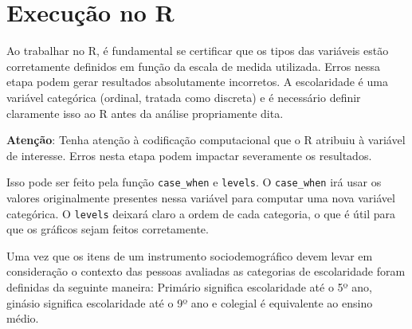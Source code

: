 \documentclass[
]{book}
\newenvironment{Shaded}{\begin{snugshade}}{\end{snugshade}}
\newcommand{\DataTypeTok}[1]{\textcolor[rgb]{0.13,0.29,0.53}{#1}}
\newcommand{\DecValTok}[1]{\textcolor[rgb]{0.00,0.00,0.81}{#1}}
\newcommand{\KeywordTok}[1]{\textcolor[rgb]{0.13,0.29,0.53}{\textbf{#1}}}
\newcommand{\NormalTok}[1]{#1}
\newcommand{\OperatorTok}[1]{\textcolor[rgb]{0.81,0.36,0.00}{\textbf{#1}}}
\newcommand{\StringTok}[1]{\textcolor[rgb]{0.31,0.60,0.02}{#1}}
\begin{document}
\hypertarget{execuuxe7uxe3o-no-r-5}{%
\section{Execução no R}\label{execuuxe7uxe3o-no-r-5}}

Ao trabalhar no R, é fundamental se certificar que os tipos das
variáveis estão corretamente definidos em função da escala de medida
utilizada. Erros nessa etapa podem gerar resultados absolutamente
incorretos. A escolaridade é uma variável categórica (ordinal, tratada
como discreta) e é necessário definir claramente isso ao R antes da
análise propriamente dita.

\begin{warning}

\textbf{Atenção}: Tenha atenção à codificação computacional que o R
atribuiu à variável de interesse. Erros nesta etapa podem impactar
severamente os resultados.

\end{warning}

Isso pode ser feito pela função \texttt{case\_when} e \texttt{levels}. O
\texttt{case\_when} irá usar os valores originalmente presentes nessa
variável para computar uma nova variável categórica. O \texttt{levels}
deixará claro a ordem de cada categoria, o que é útil para que os
gráficos sejam feitos corretamente.

Uma vez que os itens de um instrumento sociodemográfico devem levar em
consideração o contexto das pessoas avaliadas as categorias de
escolaridade foram definidas da seguinte maneira: Primário significa
escolaridade até o 5º ano, ginásio significa escolaridade até o 9º ano e
colegial é equivalente ao ensino médio.

\begin{Shaded}
\end{Shaded}
\end{document}
